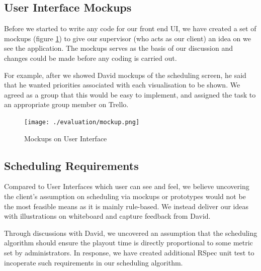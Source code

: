 \documentclass[a4paper]{article}
\begin{document}
\subsection{User Interface Mockups}
Before we started to write any code for our front end UI, we have created
a set of mockups (figure \ref{fig:mockup}) to give our supervisor (who acts 
as our client) an idea on we see the application. The mockups serves as the basis
of our discussion and changes could be made before any coding is carried out.

For example, after we showed David mockups of the scheduling screen, he said that 
he wanted priorities associated with each visualisation to be shown. We agreed as a 
group that this would be easy to implement, and assigned the task to an appropriate
group member on Trello.  %

\begin{figure}[H]
   \begin{center}
      \texttt{[image: ./evaluation/mockup.png]}
   \end{center}
   \caption{Mockups on User Interface}
   \label{fig:mockup}
\end{figure}

\subsection{Scheduling Requirements}
Compared to User Interfaces which user can see and feel, we believe 
uncovering the client's assumption on scheduling via mockups or 
prototypes would not be the most feasible means as it is mainly rule-based.
We instead deliver our ideas with illustrations on whiteboard and
capture feedback from David.

Through discussions with David, we uncovered an assumption that 
the scheduling algorithm should ensure the playout time is 
directly proportional to some metric set by administrators. In response,
we have created additional RSpec unit test to incoperate such requirements 
in our scheduling algorithm.
\end{document}
